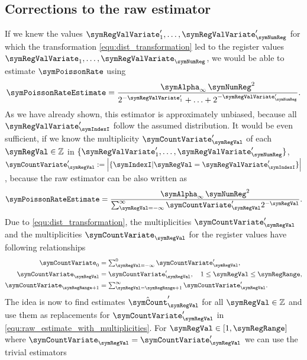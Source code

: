 \documentclass[a4paper]{scrartcl}
\begin{document}
\subsection{Corrections to the raw estimator}
If we knew the values $\symRegValVariate'_1,\ldots,\symRegValVariate'_\symNumReg$ for which the transformation \eqref{equ:dist_transformation} led to the register values $\symRegValVariate_1,\ldots,\symRegValVariate_\symNumReg$, we would be able to estimate $\symPoissonRate$ using
\begin{equation}
\symPoissonRateEstimate 
= 
\frac{\symAlpha_\infty\,\symNumReg^2}{2^{-\symRegValVariate'_1}+\ldots+2^{-\symRegValVariate'_\symNumReg}}.
\end{equation}
As we have already shown, this estimator is approximately unbiased, because all $\symRegValVariate'_\symIndexI$ follow the assumed distribution. It would be even sufficient, if we know the multiplicity $\symCountVariate'_\symRegVal$
of each $\symRegVal\in\mathbb{Z}$ in $\lbrace\symRegValVariate'_1,\ldots,\symRegValVariate'_\symNumReg\rbrace$, $\symCountVariate'_\symRegVal := \left|\lbrace \symIndexI\vert \symRegVal = \symRegValVariate'_\symIndexI\rbrace\right|$, because the raw estimator can be also written as
\begin{equation}
\label{equ:raw_estimate_with_multiplicities}
\symPoissonRateEstimate 
= 
\frac{\symAlpha_\infty\,\symNumReg^2}{\sum_{\symRegVal=-\infty}^\infty \symCountVariate'_\symRegVal 2^{-\symRegVal}}.
\end{equation}
Due to \eqref{equ:dist_transformation}, the multiplicities $\symCountVariate'_\symRegVal$ and the multiplicities $\symCountVariate_\symRegVal$ for the register values have following relationships
\begin{equation}
\label{equ:multiplicity_transformation}
\begin{aligned}
\symCountVariate_0 &= \textstyle\sum_{\symRegVal = -\infty}^{0} \symCountVariate'_\symRegVal, \\
\symCountVariate_\symRegVal &=  \symCountVariate'_\symRegVal, \quad 1\leq\symRegVal\leq\symRegRange,\\
\symCountVariate_{\symRegRange+1} &= \textstyle\sum_{\symRegVal = \symRegRange + 1}^{\infty} \symCountVariate'_\symRegVal.
\end{aligned}
\end{equation}
The idea is now to find estimates $\hat{\symCount}'_\symRegVal$ for all $\symRegVal\in\mathbb{Z}$ and use them as replacements for $\symCountVariate'_\symRegVal$ in \eqref{equ:raw_estimate_with_multiplicities}. For $\symRegVal\in[1,\symRegRange]$ where $\symCountVariate_\symRegVal = \symCountVariate'_\symRegVal$ we can use the trivial estimators 
\end{document}
